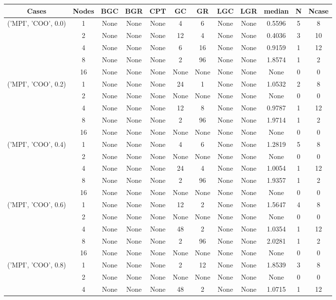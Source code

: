 \begin{tabular}{cccccccccccc}
\hline
Cases & Nodes& BGC& BGR& CPT& GC& GR& LGC& LGR& median & N & Ncase \\
\hline
\multirow{5}{*}{('MPI', 'COO', 0.0)}& 1& None& None& None& 4& 6& None& None& 0.5596& 5& 8\\
& 2& None& None& None& 12& 4& None& None& 0.4036& 3& 10\\
& 4& None& None& None& 6& 16& None& None& 0.9159& 1& 12\\
& 8& None& None& None& 2& 96& None& None& 1.8574& 1& 2\\
& 16& None& None& None& None& None& None& None& None& 0& 0\\
\hline
\multirow{5}{*}{('MPI', 'COO', 0.2)}& 1& None& None& None& 24& 1& None& None& 1.0532& 2& 8\\
& 2& None& None& None& None& None& None& None& None& 0& 0\\
& 4& None& None& None& 12& 8& None& None& 0.9787& 1& 12\\
& 8& None& None& None& 2& 96& None& None& 1.9714& 1& 2\\
& 16& None& None& None& None& None& None& None& None& 0& 0\\
\hline
\multirow{5}{*}{('MPI', 'COO', 0.4)}& 1& None& None& None& 4& 6& None& None& 1.2819& 5& 8\\
& 2& None& None& None& None& None& None& None& None& 0& 0\\
& 4& None& None& None& 24& 4& None& None& 1.0054& 1& 12\\
& 8& None& None& None& 2& 96& None& None& 1.9357& 1& 2\\
& 16& None& None& None& None& None& None& None& None& 0& 0\\
\hline
\multirow{5}{*}{('MPI', 'COO', 0.6)}& 1& None& None& None& 12& 2& None& None& 1.5647& 4& 8\\
& 2& None& None& None& None& None& None& None& None& 0& 0\\
& 4& None& None& None& 48& 2& None& None& 1.0354& 1& 12\\
& 8& None& None& None& 2& 96& None& None& 2.0281& 1& 2\\
& 16& None& None& None& None& None& None& None& None& 0& 0\\
\hline
\multirow{5}{*}{('MPI', 'COO', 0.8)}& 1& None& None& None& 2& 12& None& None& 1.8539& 3& 8\\
& 2& None& None& None& None& None& None& None& None& 0& 0\\
& 4& None& None& None& 48& 2& None& None& 1.0715& 1& 12\\

\end{tabular}
